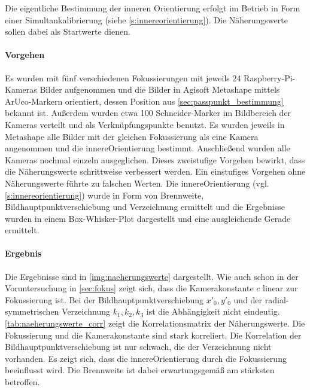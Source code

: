 \documentclass[./00PhotoBox.tex]{subfiles}
\begin{document}
Die eigentliche Bestimmung der inneren Orientierung erfolgt im Betrieb in Form einer Simultankalibrierung (siehe \autoref{s:innereorientierung}). Die Näherungswerte sollen dabei als Startwerte dienen.

\paragraph{Vorgehen}

Es wurden mit fünf verschiedenen Fokussierungen mit jeweils 24 Rasp\-berry-Pi-Kameras Bilder aufgenommen und die Bilder in Agisoft Metashape mittels ArUco-Markern orientiert, dessen Position aus \autoref{sec:passpunkt_bestimmung} bekannt ist. Außerdem wurden etwa 100 Schneider-Marker im Bildbereich der Kameras verteilt und als Verknüpfungspunkte benutzt. Es wurden jeweils in Metashape alle Bilder mit der gleichen Fokussierung als eine Kamera angenommen und die \gls{innereOrientierung} bestimmt. Anschließend wurden alle Kameras nochmal einzeln ausgeglichen. Dieses zweistufige Vorgehen bewirkt, dass die Näherungswerte schrittweise verbessert werden. Ein einstufiges Vorgehen ohne Näherungswerte führte zu falschen Werten. Die \gls{innereOrientierung} (vgl. \autoref{s:innereorientierung}) wurde in Form von Brennweite, \Gls{Bildhauptpunkt}verschiebung und \Gls{Verzeichnung} ermittelt und die Ergebnisse wurden in einem Box-Whisker-Plot dargestellt und eine ausgleichende Gerade ermittelt.

\paragraph{Ergebnis}

Die Ergebnisse sind in \autoref{img:naeherungswerte} dargestellt. Wie auch schon in der Voruntersuchung in \autoref{sec:fokus} zeigt sich, dass die \Gls{Kamerakonstante} $c$ linear zur Fokussierung ist. Bei der \Gls{Bildhauptpunkt}verschiebung $x'_0, y'_0$ und der radial-symmetrischen \Gls{Verzeichnung} $k_1,k_2,k_3$ ist die Abhängigkeit nicht eindeutig. \autoref{tab:naeherungswerte_corr} zeigt die Korrelationsmatrix der Näherungswerte. Die Fokussierung und die \Gls{Kamerakonstante} sind stark korreliert. Die Korrelation der \Gls{Bildhauptpunkt}verschiebung ist nur schwach, die der \Gls{Verzeichnung} nicht vorhanden. Es zeigt sich, dass die \gls{innereOrientierung} durch die Fokussierung beeinflusst wird. Die \Gls{Brennweite} ist dabei erwartungsgemäß am stärksten betroffen.
\end{document}
